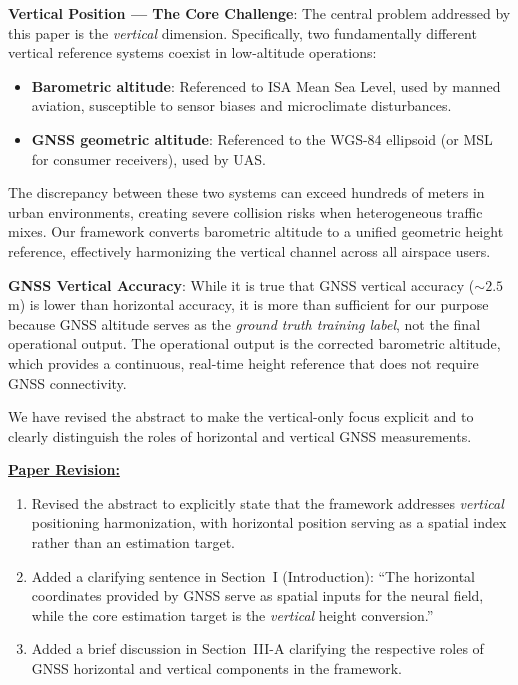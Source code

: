 \textbf{Vertical Position --- The Core Challenge}: The central problem addressed by this paper is the \emph{vertical} dimension. Specifically, two fundamentally different vertical reference systems coexist in low-altitude operations:
\begin{itemize}
    \item \textbf{Barometric altitude}: Referenced to ISA Mean Sea Level, used by manned aviation, susceptible to sensor biases and microclimate disturbances.
    \item \textbf{GNSS geometric altitude}: Referenced to the WGS-84 ellipsoid (or MSL for consumer receivers), used by UAS.
\end{itemize}
The discrepancy between these two systems can exceed hundreds of meters in urban environments, creating severe collision risks when heterogeneous traffic mixes. Our framework converts barometric altitude to a unified geometric height reference, effectively harmonizing the vertical channel across all airspace users.

\textbf{GNSS Vertical Accuracy}: While it is true that GNSS vertical accuracy (${\sim}2.5$\,m) is lower than horizontal accuracy, it is more than sufficient for our purpose because GNSS altitude serves as the \emph{ground truth training label}, not the final operational output. The operational output is the corrected barometric altitude, which provides a continuous, real-time height reference that does not require GNSS connectivity.

We have revised the abstract to make the vertical-only focus explicit and to clearly distinguish the roles of horizontal and vertical GNSS measurements.

\vspace{0.1cm}
\noindent
\underline{\textbf{Paper Revision:}}

\begin{enumerate}
    \item Revised the abstract to explicitly state that the framework addresses \emph{vertical} positioning harmonization, with horizontal position serving as a spatial index rather than an estimation target.
    \item Added a clarifying sentence in Section~I (Introduction): ``The horizontal coordinates provided by GNSS serve as spatial inputs for the neural field, while the core estimation target is the \emph{vertical} height conversion.''
    \item Added a brief discussion in Section~III-A clarifying the respective roles of GNSS horizontal and vertical components in the framework.
\end{enumerate}

